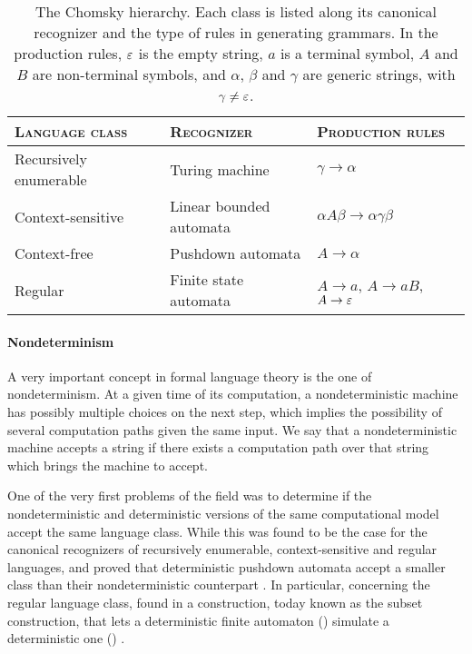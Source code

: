 \begin{table}
	\centering
	\renewcommand{\arraystretch}{1.2}
	\begin{tabular}{lll}
		\toprule
		\textsc{Language class} & \textsc{Recognizer}          & \textsc{Production rules}          \\
		\midrule
		Recursively enumerable  & Turing machine               & $\gamma\to\alpha$                  \\
		Context-sensitive       & \makecell[lt]{Linear bounded                                      \\automata} & $\alpha A\beta\to\alpha\gamma\beta$   \\
		Context-free            & Pushdown automata            & $A\to\alpha$                       \\
		Regular                 & Finite state automata        & \makecell[lt]{$A\to a$, $A\to aB$, \\$A\to\varepsilon$} \\
		\bottomrule
	\end{tabular}
	\caption{The Chomsky hierarchy. Each class is listed along its canonical recognizer and the type of rules in generating grammars. In the production rules, $\varepsilon$ is the empty string, $a$ is a terminal symbol, $A$ and $B$ are non-terminal symbols, and $\alpha$, $\beta$ and $\gamma$ are generic strings, with $\gamma\ne\varepsilon$.}
	\label{tab:chomsky}
\end{table}

\paragraph{Nondeterminism} A very important concept in formal language theory is the one of nondeterminism.
At a given time of its computation, a nondeterministic machine has possibly multiple choices on the next step, which implies the possibility of several computation paths given the same input.
We say that a nondeterministic machine accepts a string if there exists a computation path over that string which brings the machine to accept.

One of the very first problems of the field was to determine if the nondeterministic and deterministic versions of the same computational model accept the same language class.
While this was found to be the case for the canonical recognizers of recursively enumerable, context-sensitive and regular languages, \citeauthor{Fis63} and \citeauthor{Sch63} proved that deterministic pushdown automata accept a smaller class than their nondeterministic counterpart \cite{Fis63,Sch63}.
In particular, concerning the regular language class, \citeauthor{RabSco59} found in \citeyear{RabSco59} a construction, today known as the subset construction, that lets a deterministic finite automaton (\NFA) simulate a deterministic one (\DFA) \cite{RabSco59}.

